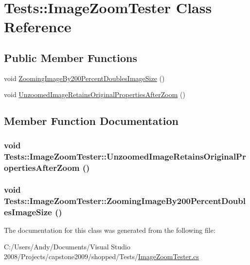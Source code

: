 \hypertarget{class_tests_1_1_image_zoom_tester}{
\section{Tests::ImageZoomTester Class Reference}
\label{class_tests_1_1_image_zoom_tester}
}
\subsection*{Public Member Functions}
\begin{DoxyCompactItemize}
\item 
void \hyperlink{class_tests_1_1_image_zoom_tester_a0d409d08e0952c4f0caffcbfa9b0f2a4}{ZoomingImageBy200PercentDoublesImageSize} ()
\item 
void \hyperlink{class_tests_1_1_image_zoom_tester_a9a658f31119f8e63a137ca5bd208d2f4}{UnzoomedImageRetainsOriginalPropertiesAfterZoom} ()
\end{DoxyCompactItemize}


\subsection{Member Function Documentation}
\hypertarget{class_tests_1_1_image_zoom_tester_a9a658f31119f8e63a137ca5bd208d2f4}{
\subsubsection[{UnzoomedImageRetainsOriginalPropertiesAfterZoom}]{\setlength{\rightskip}{0pt plus 5cm}void Tests::ImageZoomTester::UnzoomedImageRetainsOriginalPropertiesAfterZoom ()}}
\label{class_tests_1_1_image_zoom_tester_a9a658f31119f8e63a137ca5bd208d2f4}
\hypertarget{class_tests_1_1_image_zoom_tester_a0d409d08e0952c4f0caffcbfa9b0f2a4}{
\subsubsection[{ZoomingImageBy200PercentDoublesImageSize}]{\setlength{\rightskip}{0pt plus 5cm}void Tests::ImageZoomTester::ZoomingImageBy200PercentDoublesImageSize ()}}
\label{class_tests_1_1_image_zoom_tester_a0d409d08e0952c4f0caffcbfa9b0f2a4}


The documentation for this class was generated from the following file:\begin{DoxyCompactItemize}
\item 
C:/Users/Andy/Documents/Visual Studio 2008/Projects/capstone2009/shopped/Tests/\hyperlink{_image_zoom_tester_8cs}{ImageZoomTester.cs}\end{DoxyCompactItemize}
